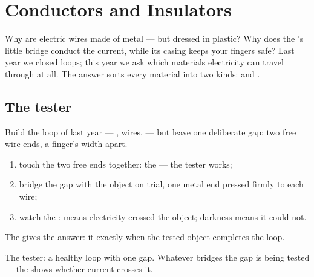 \chapter{Conductors and Insulators}\label{ch:g4:conductors-insulators}

Why are electric wires made of metal --- but dressed in plastic?
Why does the 's little bridge conduct the current, while its
casing keeps your fingers safe? Last year we closed loops; this year
we ask which materials electricity can travel through at all. The
answer sorts every material into two kinds:  and
.

\section{The tester}

\begin{method}\label{met:g4:conductors-insulators:tester}
Build the loop of last year --- , wires,  --- but leave
one deliberate gap: two free wire ends, a finger's width apart.
\begin{enumerate}
  \item touch the two free ends together: the   ---
        the tester works;
  \item bridge the gap with the object on trial, one metal end
        pressed firmly to each wire;
  \item watch the :  means electricity crossed the object;
        darkness means it could not.
\end{enumerate}
The  gives the answer: it  exactly when the tested object
completes the loop.
\end{method}

\begin{omfigure}

{\small The tester: a healthy loop with one gap. Whatever bridges
the gap is being tested --- the  shows whether current
crosses it.}
\end{omfigure}

